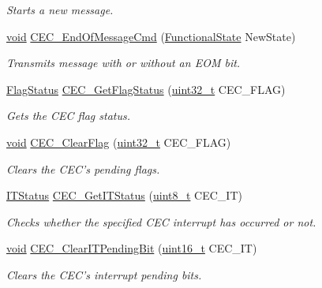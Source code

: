 \begin{DoxyCompactItemize}
\begin{DoxyCompactList}\small\item\em Starts a new message. \end{DoxyCompactList}\item 
\hyperlink{group___n_a_m_e_ga18028b8badbf1ea7e704ccac3c488e82}{void} \hyperlink{group___c_e_c___private___functions_ga1e2cf6e3a1ac891f2814f9d3f4043574}{C\-E\-C\-\_\-\-End\-Of\-Message\-Cmd} (\hyperlink{group___exported__types_gac9a7e9a35d2513ec15c3b537aaa4fba1}{Functional\-State} New\-State)
\begin{DoxyCompactList}\small\item\em Transmits message with or without an E\-O\-M bit. \end{DoxyCompactList}\item 
\hyperlink{group___exported__types_ga89136caac2e14c55151f527ac02daaff}{Flag\-Status} \hyperlink{group___c_e_c___private___functions_gaf920706cb350182bf0728c66868053ca}{C\-E\-C\-\_\-\-Get\-Flag\-Status} (\hyperlink{stdint_8h_a435d1572bf3f880d55459d9805097f62}{uint32\-\_\-t} C\-E\-C\-\_\-\-F\-L\-A\-G)
\begin{DoxyCompactList}\small\item\em Gets the C\-E\-C flag status. \end{DoxyCompactList}\item 
\hyperlink{group___n_a_m_e_ga18028b8badbf1ea7e704ccac3c488e82}{void} \hyperlink{group___c_e_c___private___functions_ga928b373fb5972204c56f9c64113f8c67}{C\-E\-C\-\_\-\-Clear\-Flag} (\hyperlink{stdint_8h_a435d1572bf3f880d55459d9805097f62}{uint32\-\_\-t} C\-E\-C\-\_\-\-F\-L\-A\-G)
\begin{DoxyCompactList}\small\item\em Clears the C\-E\-C's pending flags. \end{DoxyCompactList}\item 
\hyperlink{group___exported__types_gaacbd7ed539db0aacd973a0f6eca34074}{I\-T\-Status} \hyperlink{group___c_e_c___private___functions_gaa1940a388d0bfcefe7483fb74cc2ba1d}{C\-E\-C\-\_\-\-Get\-I\-T\-Status} (\hyperlink{stdint_8h_aba7bc1797add20fe3efdf37ced1182c5}{uint8\-\_\-t} C\-E\-C\-\_\-\-I\-T)
\begin{DoxyCompactList}\small\item\em Checks whether the specified C\-E\-C interrupt has occurred or not. \end{DoxyCompactList}\item 
\hyperlink{group___n_a_m_e_ga18028b8badbf1ea7e704ccac3c488e82}{void} \hyperlink{group___c_e_c___private___functions_gade646921262a077172c708953822f248}{C\-E\-C\-\_\-\-Clear\-I\-T\-Pending\-Bit} (\hyperlink{stdint_8h_a273cf69d639a59973b6019625df33e30}{uint16\-\_\-t} C\-E\-C\-\_\-\-I\-T)
\begin{DoxyCompactList}\small\item\em Clears the C\-E\-C's interrupt pending bits. \end{DoxyCompactList}\end{DoxyCompactItemize}


